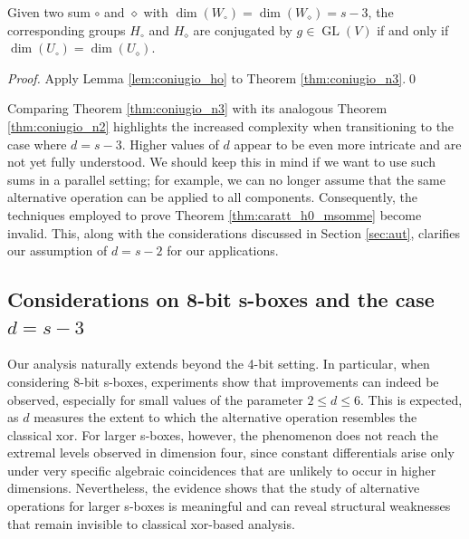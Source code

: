 \documentclass[runningheads,a4paper,english]{llncs}
\DeclareMathOperator{\GL}{GL}
\begin{document}
\begin{corollary}
    Given two sum $\circ$ and $\diamond$ with $\dim(W_\circ)=\dim(W_\diamond)=s-3$, the corresponding groups $H_\circ$ and $H_\diamond$ are conjugated by $g \in \GL(V)$ if and only if $\dim(U_\circ) = \dim(U_\diamond)$.
\end{corollary}
\begin{proof}
	Apply Lemma \ref{lem:coniugio_ho} to Theorem \ref{thm:coniugio_n3}.\qed
\end{proof}
Comparing Theorem \ref{thm:coniugio_n3} with its analogous Theorem \ref{thm:coniugio_n2} highlights the increased complexity when transitioning to the case where  $d = s-3$. Higher values of  $d$  appear to be even more intricate and are not yet fully understood. We should keep this in mind if we want to  use such sums in a parallel setting; for example, we can no longer assume that the same alternative operation can be applied to all components. Consequently, the techniques employed to prove Theorem \ref{thm:caratt_h0_msomme} become invalid. This, along with the considerations discussed in Section \ref{sec:aut}, clarifies our assumption of  $d = s-2$  for our applications.

\subsection{Considerations on 8-bit s-boxes and the case $d=s-3$}

Our analysis naturally extends beyond the 4-bit setting. In particular, when considering 8-bit s-boxes, experiments show that improvements can indeed be observed, especially for small values of the parameter $2 \leq d \leq 6$. This is expected, as $d$ measures the extent to which the alternative operation resembles the classical xor. For larger s-boxes, however, the phenomenon does not reach the extremal levels observed in dimension four, since constant differentials arise only under very specific algebraic coincidences that are unlikely to occur in higher dimensions. Nevertheless, the evidence shows that the study of alternative operations for larger s-boxes is meaningful and can reveal structural weaknesses that remain invisible to classical xor-based analysis.
\end{document}
